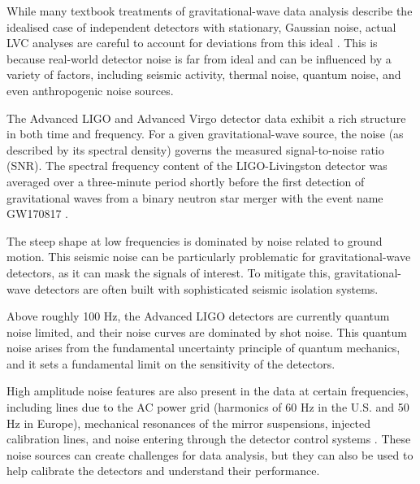 While many textbook treatments of gravitational-wave data analysis describe the idealised case of independent detectors with stationary, Gaussian noise, actual LVC analyses are careful to account for deviations from this ideal \cite{00.1_2012GWAnalysisFormalism} \cite{00.3_GravitationalWaveResearch}. This is because real-world detector noise is far from ideal and can be influenced by a variety of factors, including seismic activity, thermal noise, quantum noise, and even anthropogenic noise sources.

The Advanced LIGO and Advanced Virgo detector data exhibit a rich structure in both time and frequency. For a given gravitational-wave source, the noise (as described by its spectral density) governs the measured signal-to-noise ratio (SNR). The spectral frequency content of the LIGO-Livingston detector was averaged over a three-minute period shortly before the first detection of gravitational waves from a binary neutron star merger with the event name GW170817 \cite{00.5_GWDetectionNoiseCatalogue}.

The steep shape at low frequencies is dominated by noise related to ground motion. This seismic noise can be particularly problematic for gravitational-wave detectors, as it can mask the signals of interest. To mitigate this, gravitational-wave detectors are often built with sophisticated seismic isolation systems.

Above roughly 100 Hz, the Advanced LIGO detectors are currently quantum noise limited, and their noise curves are dominated by shot noise. This quantum noise arises from the fundamental uncertainty principle of quantum mechanics, and it sets a fundamental limit on the sensitivity of the detectors.

High amplitude noise features are also present in the data at certain frequencies, including lines due to the AC power grid (harmonics of 60 Hz in the U.S. and 50 Hz in Europe), mechanical resonances of the mirror suspensions, injected calibration lines, and noise entering through the detector control systems \cite{00.1_2012GWAnalysisFormalism} \cite{00.5_GWDetectionNoiseCatalogue} \cite{00.3_GravitationalWaveResearch}. These noise sources can create challenges for data analysis, but they can also be used to help calibrate the detectors and understand their performance.

